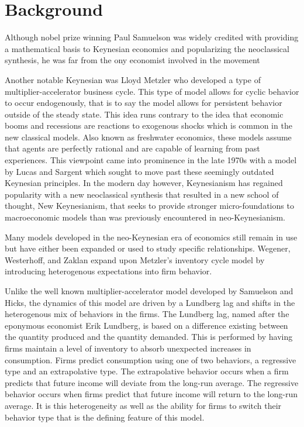 \section{Background}
Although nobel prize winning Paul Samuelson was widely credited with providing a mathematical basis to Keynesian economics and popularizing the neoclassical synthesis, he was far from the ony economist involved in the movement\autocite{Skousen1997,Samuelson1939}

Another notable Keynesian was Lloyd Metzler who developed a type of multiplier-accelerator business cycle. This type of model allows for cyclic behavior to occur endogenously, that is to say the model allows for persistent behavior outside of the steady state. This idea runs contrary to the idea that economic booms and recessions are reactions to exogenous shocks which is common in the new classical models. Also known as freshwater economics, these models assume that agents are perfectly rational and are capable of learning from past experiences. This viewpoint came into prominence in the late 1970s with a model by Lucas and Sargent\autocite{Lucas1979} which sought to move past these seemingly outdated Keynesian principles. In the modern day however, Keynesianism has regained popularity with a new neoclassical synthesis that resulted in a new school of thought, New Keynesianism, that seeks to provide stronger micro-foundations to macroeconomic models than was previously encountered in neo-Keynesianism. 

Many models developed in the neo-Keynesian era of economics still remain in use but have either been expanded or used to study specific relationships. Wegener, Westerhoff, and Zaklan expand upon Metzler's inventory cycle model by introducing heterogenous expectations into firm behavior\autocite{Wegener2009}. 

Unlike the well known multiplier-accelerator model developed by Samuelson and Hicks, the dynamics of this model are driven by a Lundberg lag and shifts in the heterogenous mix of behaviors in the firms. The Lundberg lag, named after the eponymous economist Erik Lundberg, is based on a difference existing between the quantity produced and the quantity demanded. This is performed by having firms maintain a level of inventory to absorb unexpected increases in consumption. Firms predict consumption using  one of two behaviors, a regressive type and an extrapolative type. The extrapolative behavior occurs when a firm predicts that future income will deviate from the long-run average. The regressive behavior occurs when firms predict that future income will return to the long-run average. It is this heterogeneity as well as the ability for firms to switch their behavior type that is the defining feature of this model. 

